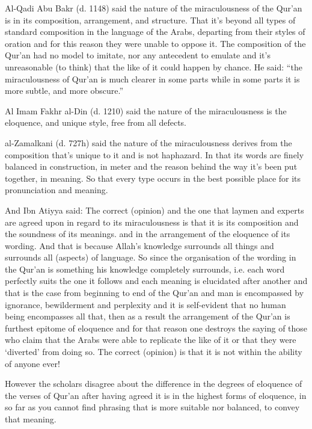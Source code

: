 \documentclass[12pt]{book}
\begin{document}
Al-Qadi Abu Bakr (d. 1148) said the nature of the miraculousness of the Qur’an
is in its composition, arrangement, and structure. That it’s beyond all types
of standard composition in the language of the Arabs, departing from their
styles of oration and for this reason they were unable to oppose it. The
composition of the Qur’an had no model to imitate, nor any antecedent to
emulate and it’s unreasonable (to think) that the like of it could happen by
chance. He said: “the miraculousness of Qur’an is much clearer in some parts
while in some parts it is more subtle, and more obscure.”\footnotemark


Al Imam Fakhr al-Din (d. 1210) said the nature of the miraculousness is the
eloquence, and unique style, free from all defects.

al-Zamalkani (d. 727h) said the nature of the miraculousness derives from the
composition that’s unique to it and is not haphazard. In that its words are
finely balanced in construction, in meter and the reason behind the way it’s
been put together, in meaning. So that every type occurs in the best possible
place for its pronunciation and meaning.

And Ibn Atiyya said: The correct (opinion) and the one that laymen and experts
are agreed upon in regard to its miraculousness is that it is its composition
and the soundness of its meanings. and in the arrangement of the eloquence of
its wording. And that is because Allah’s knowledge surrounds all things and
surrounds all (aspects) of language. So since the organisation of the wording
in the Qur’an is something his knowledge completely surrounds, i.e. each word
perfectly suits the one it follows and each meaning is elucidated after another
and that is the case from beginning to end of the Qur’an and man is encompassed
by ignorance, bewilderment and perplexity and it is self-evident that no human
being encompasses all that, then as a result the arrangement of the Qur’an is
furthest epitome of eloquence and for that reason one destroys the saying of
those who claim that the Arabs were able to replicate the like of it or that
they were ‘diverted’ from doing so. The correct (opinion) is that it is not
within the ability of anyone ever!\footnotemark


However the scholars disagree about the difference in the degrees of eloquence
of the verses of Qur’an after having agreed it is in the highest forms of
eloquence, in so far as you cannot find phrasing that is more suitable nor
balanced, to convey that meaning.
\end{document}
